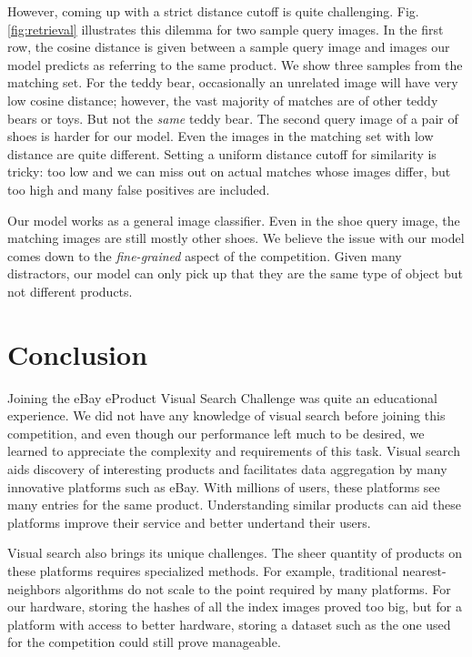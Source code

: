 \documentclass[conference]{IEEEtran}
\begin{document}
However, coming up with a strict distance cutoff is quite challenging.
Fig.\ref{fig:retrieval} illustrates this dilemma for two sample query images.
In the first row, the cosine distance is given between a sample query image and 
images our model predicts as referring to the same product.
We show three samples from the matching set.
For the teddy bear, occasionally an unrelated image will have very low cosine distance;
however, the vast majority of matches are of other teddy bears or toys.
But not the \emph{same} teddy bear.
The second query image of a pair of shoes is harder for our model.
Even the images in the matching set with low distance are quite different.
Setting a uniform distance cutoff for similarity is tricky: too low and we can miss 
out on actual matches whose images differ, but too high and many false positives are
included.

Our model works as a general image classifier. 
Even in the shoe query image, the matching images are still mostly other shoes.
We believe the issue with our model comes down to the \emph{fine-grained} aspect of the 
competition.
Given many distractors, our model can only pick up that they are the same type of object
but not different products.
\section{Conclusion}
Joining the eBay eProduct Visual Search Challenge was quite an educational experience.
We did not have any knowledge of visual search before joining this competition, and even though 
our performance left much to be desired, we learned to appreciate the complexity and 
requirements of this task.
Visual search aids discovery of interesting products and facilitates data aggregation 
by many innovative platforms such as eBay.
With millions of users, these platforms see many entries for the same product.
Understanding similar products can aid these platforms improve their service and 
better undertand their users.

Visual search also brings its unique challenges.
The sheer quantity of products on these platforms requires specialized methods.
For example, traditional nearest-neighbors algorithms do not scale to the point
required by many platforms.
For our hardware, storing the hashes of all the index images proved too big,
but for a platform with access to better hardware, storing a dataset such as the 
one used for the competition could still prove manageable.

\printbibliography
\end{document}
